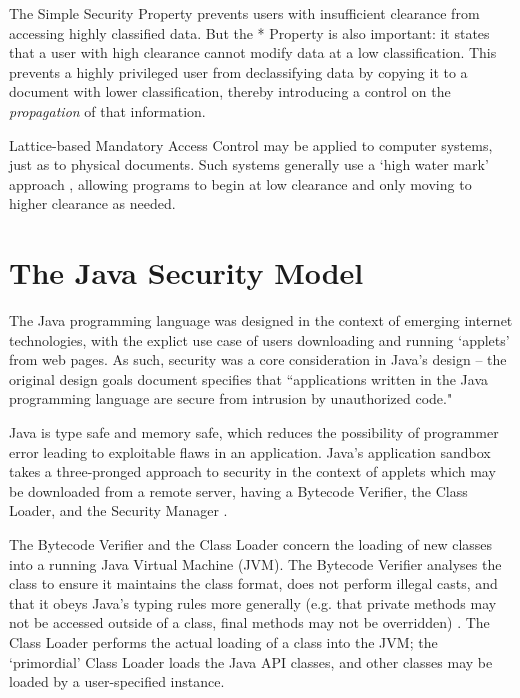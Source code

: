 The Simple Security Property prevents users with insufficient clearance from accessing highly classified data. But the * Property is also important: it states that a user with high clearance cannot modify data at a low classification. This prevents a highly privileged user from declassifying data by copying it to a document with lower classification, thereby introducing a control on the \textit{propagation} of that information.

Lattice-based Mandatory Access Control may be applied to computer systems, just as to physical documents. Such systems generally use a `high water mark' approach \cite{jones1975highwatermark}, allowing programs to begin at low clearance and only moving to higher clearance as needed.

\section{The Java Security Model}

The Java programming language was designed in the context of emerging internet technologies, with the explict use case of users downloading and running `applets' from web pages. As such, security was a core consideration in Java's design -- the original design goals document \cite{javadesignprinciples} specifies that ``applications written in the Java programming language are secure from intrusion by unauthorized code."

Java is type safe and memory safe, which reduces the possibility of programmer error leading to exploitable flaws in an application. Java's application sandbox takes a three-pronged approach to security in the context of applets which may be downloaded from a remote server, having a Bytecode Verifier, the Class Loader, and the Security Manager \cite{mcgraw1999securingjava}.

The Bytecode Verifier and the Class Loader concern the loading of new classes into a running Java Virtual Machine (JVM). The Bytecode Verifier analyses the class to ensure it maintains the class format, does not perform illegal casts, and that it obeys Java's typing rules more generally (e.g. that private methods may not be accessed outside of a class, final methods may not be overridden) \cite{lindholm2014java}. The Class Loader performs the actual loading of a class into the JVM; the `primordial' Class Loader \cite{mcgraw1999securingjava} loads the Java API classes, and other classes may be loaded by a user-specified  instance.

